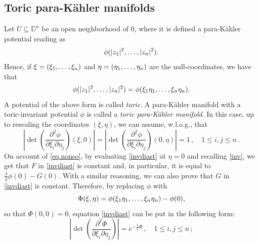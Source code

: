 \documentclass[11pt, reqno]{amsart}
\newcommand{\de}{\partial}
\newcommand{\D}{\mathds{D}}
\newcommand{\pk }{para-K\"{a}hler }
\begin{document}
\subsection{Toric \pk manifolds}



Let  $U\subseteq \D^n$ be an open neighborhood of 0, where it is defined a \pk potential reading as
$$\phi(|z_1|^2,\mathellipsis, |z_n|^2).$$
Hence, if  $\xi=(\xi_1,\mathellipsis,\xi_n)$ and $\eta=(\eta_1,\mathellipsis,\eta_n)$ are  the null-coordinates, we have that 
\begin{equation}\label{inv}
\phi(|z_1|^2,\mathellipsis, |z_n|^2)=\phi(\xi_1\eta_1,\mathellipsis, \xi_n\eta_n).
\end{equation}
A potential of the above form is called \emph{toric}. A \pk manifold with a toric-invariant potential $\phi$ is called a \emph{toric \pk manifold}. In this case, up to rescaling the coordinates $(\xi,\eta)$, we can assume, w.l.o.g., that
\begin{equation}\label{eq.nonso}
\left|\det\left( \frac{\de^2 \phi}{\de \xi_i\de \eta_j}\right)(\xi,0)\right|=\left|\det\left( \frac{\de^2 \phi}{\de \xi_i\de \eta_j}\right)(0,\eta)\right|=1\, , \quad 1\leq i,j\leq n\,.
\end{equation}
On account of \eqref{eq.nonso}, by evaluating \eqref{invdiast} at $\eta=0$ and recalling \eqref{inv},
 we get that $F$ in \eqref{invdiast} is constant and, in particular, it is equal to $\frac{\lambda}{2}\phi(0)-G(0)$. With a similar reasoning, we can also prove that $G$ in \eqref{invdiast} is constant. 
Therefore,  by replacing  $\phi$ with 
\begin{equation}\label{repl}
\Phi(\xi,\eta)= \phi(\xi_1\eta_1,\mathellipsis, \xi_n\eta_n) -\phi(0),
\end{equation}
so that $\Phi(0,0)=0$,
equation \eqref{invdiast} can be put in the following form:
\begin{equation}\label{MAlambda}
\left|\det\left( \frac{\de^2 \Phi}{\de \xi_i\de \eta_j}\right)\right|=
e^{-\frac{\lambda}{2}\Phi}\,, \quad 1\leq i,j\leq n\,;
\end{equation}
\end{document}
